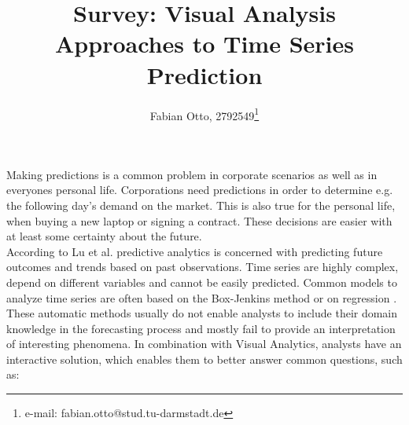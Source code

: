 \documentclass[electronic]{vgtc}             %
\title{Survey: Visual Analysis Approaches to Time Series Prediction}
\author{Fabian Otto, 2792549\thanks{e-mail: fabian.otto@stud.tu-darmstadt.de}}
\affiliation{\scriptsize Technische Universit\"at Darmstadt}
\begin{document}

\maketitle

Making predictions is a common problem in corporate scenarios as well as in everyones personal life. 
Corporations need predictions in order to determine e.g. the following day's demand on the market.
This is also true for the personal life, when buying a new laptop or signing a contract.
These decisions are easier with at least some certainty about the future.\\
According to Lu et al. \cite{Lu:2017} predictive analytics is concerned with predicting future outcomes and trends based on past observations.
Time series are highly complex, depend on different variables and cannot be easily predicted. 
Common models to analyze time series are often based on the Box-Jenkins method \cite{box:2015} or on regression \cite{draper:2014}.
These automatic methods usually do not enable analysts to include their domain knowledge in the forecasting process and mostly fail to provide an interpretation of interesting phenomena.
In combination with Visual Analytics, analysts have an interactive solution, which enables them to better answer common questions, such as: 
\end{document}
